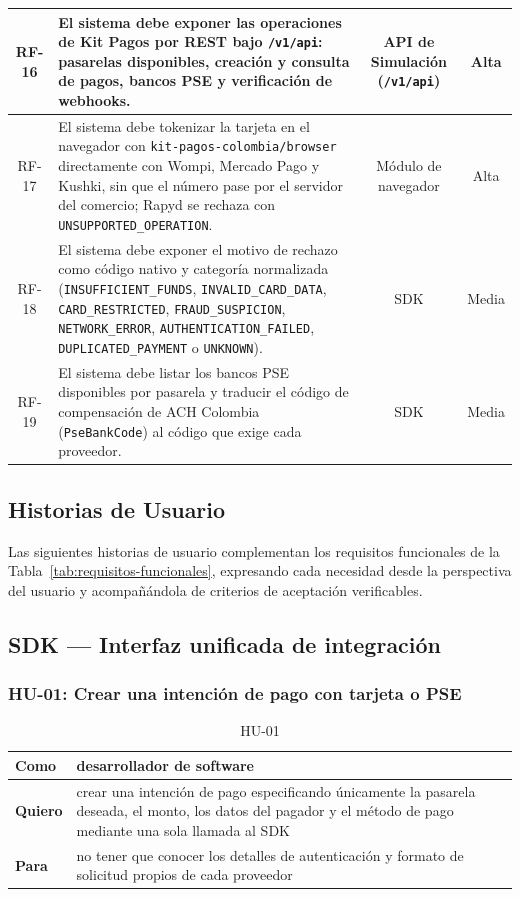 \begin{center}
\begin{longtable}{|c|p{8.1cm}|c|c|}
  \hline
  RF-16 & El sistema debe exponer las operaciones de Kit Pagos por REST bajo \texttt{/v1/api}: pasarelas disponibles, creación y consulta de pagos, bancos PSE y verificación de webhooks. & API de Simulación (\texttt{/v1/api}) & Alta \\
  \hline
  RF-17 & El sistema debe tokenizar la tarjeta en el navegador con \texttt{kit-pagos-colombia/browser} directamente con Wompi, Mercado Pago y Kushki, sin que el número pase por el servidor del comercio; Rapyd se rechaza con \texttt{UNSUPPORTED\_OPERATION}. & Módulo de navegador & Alta \\
  \hline
  RF-18 & El sistema debe exponer el motivo de rechazo como código nativo y categoría normalizada (\texttt{INSUFFICIENT\_FUNDS}, \texttt{INVALID\_CARD\_DATA}, \texttt{CARD\_RESTRICTED}, \texttt{FRAUD\_SUSPICION}, \texttt{NETWORK\_ERROR}, \texttt{AUTHENTICATION\_FAILED}, \texttt{DUPLICATED\_PAYMENT} o \texttt{UNKNOWN}). & SDK & Media \\
  \hline
  RF-19 & El sistema debe listar los bancos PSE disponibles por pasarela y traducir el código de compensación de ACH Colombia (\texttt{PseBankCode}) al código que exige cada proveedor. & SDK & Media \\
  \hline
\end{longtable}
\end{center}

\subsection{Historias de Usuario}

Las siguientes historias de usuario complementan los requisitos funcionales de la Tabla~\ref{tab:requisitos-funcionales}, expresando cada necesidad desde la perspectiva del usuario y acompañándola de criterios de aceptación verificables.

\subsection{SDK --- Interfaz unificada de integración}

\subsubsection{HU-01: Crear una intención de pago con tarjeta o PSE}
\begin{table}[H]
  \centering
  \renewcommand{\arraystretch}{1.2}
  \begin{tabularx}{\textwidth}{|l|X|}
    \hline
    \textbf{Como} & desarrollador de software \\
    \hline
    \textbf{Quiero} & crear una intención de pago especificando únicamente la pasarela deseada, el monto, los datos del pagador y el método de pago mediante una sola llamada al SDK \\
    \hline
    \textbf{Para} & no tener que conocer los detalles de autenticación y formato de solicitud propios de cada proveedor \\
    \hline
  \end{tabularx}
  \caption{HU-01}
  \label{tab:hu-01}
\end{table}

